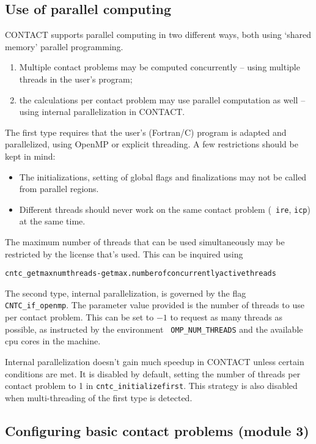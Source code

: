 \documentclass[12pt]{report}
\begin{document}
\subsection{Use of parallel computing}

CONTACT supports parallel computing in two different ways, both using
`shared memory' parallel programming.
\begin{enumerate}
\item Multiple contact problems may be computed concurrently -- using
        multiple threads in the user's program;
\item the calculations per contact problem may use parallel computation
        as well -- using internal parallelization in CONTACT.
\end{enumerate}
The first type requires that the user's (Fortran/C) program is adapted and
parallelized, using OpenMP or explicit threading. A few restrictions should
be kept in mind:
\begin{itemize}
\item The initializations, setting of global flags and finalizations may
        not be called from parallel regions.
\item Different threads should never work on the same contact problem ({\tt
        ire}, {\tt icp}) at the same time.
\end{itemize}
The maximum number of threads that can be used simultaneously may be
restricted by the license that's used. This can be inquired using
\begin{alltt}\small
cntc_getmaxnumthreads       - get max.number of concurrently active threads
\end{alltt}
The second type, internal parallelization, is governed by the flag {\tt
CNTC\_if\_openmp}. The parameter value provided is the number of threads
to use per contact problem. This can be set to $-1$ to request as many
threads as possible, as instructed by the environment {\tt
OMP\_NUM\_THREADS} and the available cpu cores in the machine.

Internal parallelization doesn't gain much speedup in CONTACT unless
certain conditions are met. It is disabled by default, setting the number
of threads per contact problem to 1 in {\tt cntc\_initia\-li\-ze\-first}. This
strategy is also disabled when multi-threading of the first type is detected.

\subsection{Configuring basic contact problems (module 3)}
\end{document}

